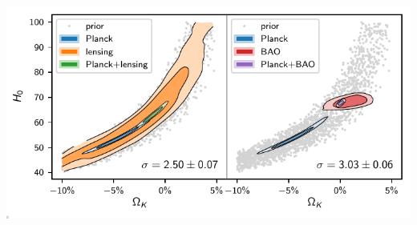 \documentclass[aspectratio=169]{beamer}
\begin{document}
\begin{frame}
\begin{columns}
            \includegraphics[width=\textwidth]{figures/omegak_H0_2.pdf}
        \end{columns}
    \end{frame}
\end{document}
